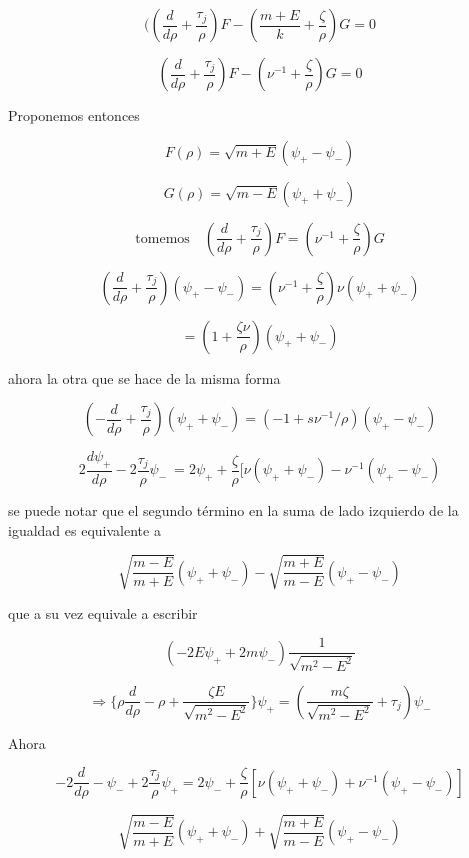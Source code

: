 \documentclass{report}
\begin{document}
\[((\frac{d}{d\rho } + \frac{\tau _j}{\rho }) F - (\frac{m+E}{k} + \frac{\zeta}{\rho }) G = 0\]

\begin{equation}
(\frac{d}{d\rho } + \frac{\tau _j }{\rho }) F - (\nu ^{-1} + \frac{\zeta}{\rho})G = 0
\end{equation}

Proponemos entonces

\[F(\rho) = \sqrt{m + E} (\psi _{+} - \psi _{-})\]

\[G(\rho) = \sqrt{m-E} (\psi _+ + \psi _- )\]

\[\text{tomemos} \quad (\frac{d}{d\rho} + \frac{\tau _j }{\rho}) F = (\nu ^{-1} + \frac{\zeta}{\rho})G\]

\[(\frac{d}{d\rho} + \frac{\tau _j }{\rho})(\psi _+ - \psi _-) = (\nu^{-1} + \frac{\zeta}{\rho}) \nu (\psi_+ + \psi _- )\]

\begin{equation}
= (1+ \frac{\zeta \nu}{\rho})(\psi _+ + \psi _- )
\end{equation}

ahora la otra que se hace de la misma forma

\begin{equation}
(- \frac{d}{d\rho} + \frac{\tau _j }{\rho})(\psi _+ + \psi _-) = (-1 + s \nu ^{-1}/\rho)(\psi _+ - \psi _-)
\end{equation}


\[2 \frac{d \psi_+ }{d \rho} - 2 \frac{\tau _j }{\rho} \psi _-\ = 2 \psi _+ + \frac{\zeta}{\rho}[\nu (\psi _+ + \psi _- )- \nu^{-1}(\psi _+ - \psi _- )\]

se puede notar que el segundo término en la suma de lado izquierdo de la igualdad es equivalente a

\[\sqrt{\frac{m-E}{m+E}} (\psi _+ + \psi _-) - \sqrt{\frac{m+E}{m-E}} (\psi _+ - \psi _-)\]

que a su vez equivale a escribir

\[(-2E \psi _+ + 2m \psi _- ) \frac{1}{\sqrt{m^2 - E^2 }}\]

\[\Rightarrow \lbrace \rho \frac{d}{d\rho} - \rho + \frac{\zeta E}{\sqrt{m^2 - E^2 }} \rbrace \psi _+ = (\frac{m \zeta }{\sqrt{m^2 - E^2}} + \tau _j ) \psi _- \]

Ahora 

\[-2 \frac{d}{d\rho} - \psi _- + 2 \frac{\tau _j }{\rho} \psi _+ = 2 \psi _- + \frac{\zeta}{\rho} [\nu (\psi _+ + \psi _- ) + \nu ^{-1} (\psi _+ - \psi _- )]\]

\[\sqrt{\frac{m-E}{m+E}} (\psi _+ + \psi _- ) + \sqrt{\frac{m+E}{m-E}} (\psi _+ - \psi _- )\]
\end{document}
